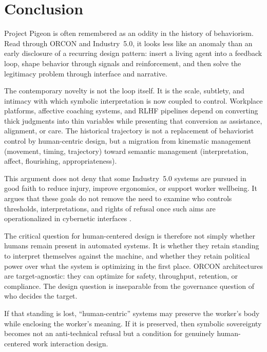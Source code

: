 \documentclass[runningheads]{llncs}
\begin{document}
\section{Conclusion}

Project Pigeon is often remembered as an oddity in the history of behaviorism. Read through ORCON and Industry~5.0, it looks less like an anomaly than an early disclosure of a recurring design pattern: insert a living agent into a feedback loop, shape behavior through signals and reinforcement, and then solve the legitimacy problem through interface and narrative.

The contemporary novelty is not the loop itself. It is the scale, subtlety, and intimacy with which symbolic interpretation is now coupled to control. Workplace platforms, affective coaching systems, and RLHF pipelines depend on converting thick judgments into thin variables while presenting that conversion as assistance, alignment, or care. The historical trajectory is not a replacement of behaviorist control by human-centric design, but a migration from kinematic management (movement, timing, trajectory) toward semantic management (interpretation, affect, flourishing, appropriateness).

This argument does not deny that some Industry~5.0 systems are pursued in good faith to reduce injury, improve ergonomics, or support worker wellbeing. It argues that these goals do not remove the need to examine who controls thresholds, interpretations, and rights of refusal once such aims are operationalized in cybernetic interfaces \cite{breque2021industry}.

The critical question for human-centered design is therefore not simply whether humans remain present in automated systems. It is whether they retain standing to interpret themselves against the machine, and whether they retain political power over what the system is optimizing in the first place. ORCON architectures are target-agnostic: they can optimize for safety, throughput, retention, or compliance. The design question is inseparable from the governance question of who decides the target.

If that standing is lost, ``human-centric'' systems may preserve the worker's body while enclosing the worker's meaning. If it is preserved, then symbolic sovereignty becomes not an anti-technical refusal but a condition for genuinely human-centered work interaction design.
\end{document}
